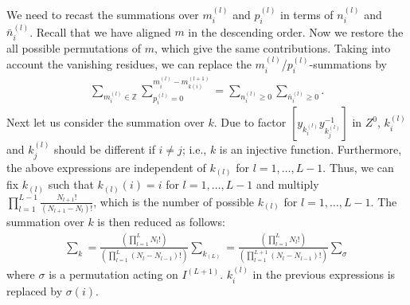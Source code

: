 \documentclass[a4paper,11pt]{article}
\begin{document}
We need to recast the summations over $m^{(l)}_i$ and $p^{(l)}_i$ in terms of $n^{(l)}_i$ and $\bar n^{(l)}_i$. Recall that we have aligned $m$ in the descending order. Now we restore the all possible permutations of $m$, which give the same contributions. Taking into account the vanishing residues, we can replace the $m^{(l)}_i$/$p^{(l)}_i$-summations by
\begin{align}
\sum_{m^{(l)}_i \in \mathbb Z} \sum_{p^{(l)}_i = 0}^{m^{(l)}_i-m^{(l+1)}_{k(i)}} = \sum_{n^{(l)}_i \geq 0} \sum_{\bar n^{(l)}_i \geq 0}.
\end{align}
Next let us consider the summation over $k$. Due to factor $[y_{k^{(l)}_i} y_{k^{(l)}_j}^{-1}]$ in $Z^0$, $k^{(l)}_i$ and $k^{(l)}_j$ should be different if $i \neq j$; i.e., $k$ is an injective function. Furthermore, the above expressions are independent of $k_{(l)}$ for $l = 1,\ldots,L-1$. Thus, we can fix $k_{(l)}$ such that $k_{(l)} (i) = i$ for $l = 1,\ldots,L-1$ and multiply $\prod_{l = 1}^{L-1} \frac{N_{l+1}!}{(N_{l+1}-N_l)!}$, which is the number of possible $k_{(l)}$ for $l = 1,\ldots,L-1$. The summation over $k$ is then reduced as follows:
\begin{align}
\sum_k = \frac{\left(\prod_{l = 1}^L N_l!\right)}{\left(\prod_{l = 1}^L (N_l-N_{l-1})!\right)} \sum_{k_{(L)}} = \frac{\left(\prod_{l = 1}^L N_l!\right)}{\left(\prod_{l = 1}^{L+1} (N_l-N_{l-1})!\right)} \sum_{\sigma}
\end{align}
where $\sigma$ is a permutation acting on $I^{(L+1)}$. $k^{(l)}_i$ in the previous expressions is replaced by $\sigma(i)$.
\end{document}
